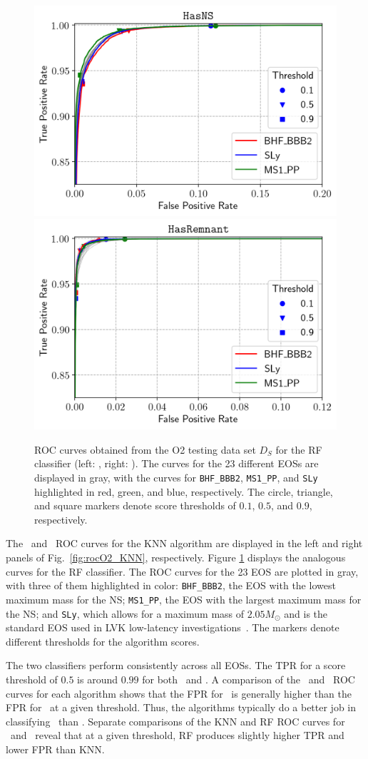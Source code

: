 \begin{figure}%
\includegraphics[width=0.47\linewidth]{roc_testing_RF_NS}
\includegraphics[width=0.45\linewidth]{roc_testing_RF_REM}
\caption{\ac{ROC} curves obtained from the \ac{O2} testing data set $D_S$ for the \ac{RF} classifier (left: \hasns, right: \hasrem). The curves for the 23 different \ac{EOS}s are displayed in
gray, with the curves for {\tt BHF\_BBB2}, {\tt MS1\_PP}, and {\tt SLy} highlighted in red, green, and blue, respectively. The circle, triangle, and square markers denote score thresholds of
$0.1$, $0.5$, and $0.9$, respectively.}
\label{fig:rocO2_RF}
\end{figure}

The \hasns\ and \hasrem\ \ac{ROC} curves for the  \ac{KNN} algorithm are displayed in the left and right panels of Fig.~\ref{fig:rocO2_KNN}, respectively. Figure \ref{fig:rocO2_RF}
displays the analogous curves for the \ac{RF} classifier. The \ac{ROC} curves for the 23 \ac{EOS} are plotted in gray, with three of them highlighted in color: {\tt BHF\_BBB2}, the
\ac{EOS} with the lowest maximum mass for the NS; {\tt MS1\_PP}, the \ac{EOS} with the largest maximum mass for the \ac{NS}; and {\tt SLy}, which allows for a maximum mass of $2.05
M_\odot$ and is the standard \ac{EOS} used in \ac{LVK} low-latency investigations~\cite{Ghosh:2021eqv}. The markers denote different thresholds for the algorithm scores. 

The two classifiers perform consistently across all \ac{EOS}s. The \ac{TPR} for a score threshold of $0.5$ is around $0.99$ for both \hasns\ and \hasrem. A comparison of the \hasns\ and
\hasrem\ \ac{ROC} curves for each algorithm shows that the \ac{FPR} for \hasns\ is generally higher than the \ac{FPR} for \hasrem\ at a given threshold. Thus, the algorithms typically do
a better job in classifying \hasrem\ than \hasns. Separate comparisons of the \ac{KNN} and \ac{RF} \ac{ROC} curves for \hasns\ and \hasrem\ reveal that at a given threshold, \ac{RF}
produces slightly higher \ac{TPR} and lower \ac{FPR} than \ac{KNN}.

